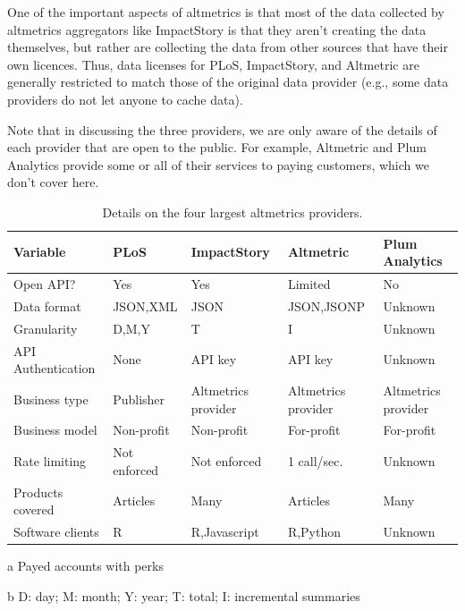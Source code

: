 \documentclass[letterpaper,superscriptaddress,showkeys,longbibliography]{revtex4-1}\usepackage{graphicx, color}
\begin{document}
One of the important aspects of altmetrics is that most of the data collected by altmetrics aggregators like ImpactStory is that they aren't creating the data themselves, but rather are collecting the data from other sources that have their own licences. Thus, data licenses for PLoS, ImpactStory, and Altmetric are generally restricted to match those of the original data provider (e.g., some data providers do not let anyone to cache data). 

Note that in discussing the three providers, we are only aware of the details of each provider that are open to the public. For example, Altmetric and Plum Analytics provide some or all of their services to paying customers, which we don't cover here. 

\begin{table}[!ht]
    \begin{threeparttable}[b]
    \caption{Details on the four largest altmetrics providers.}\label{tab:a} %
        \begin{tabular}{|l|l|l|l|l|}
            \hline
            Variable & PLoS & ImpactStory & Altmetric & Plum Analytics \\
            \hline
            Open API? & Yes & Yes & Limited\tnote{d} & No \\
            Data format & JSON,XML & JSON & JSON,JSONP & Unknown \\
            Granularity\tnote{b} & D,M,Y & T & I & Unknown \\
            API Authentication & None & API key & API key & Unknown \\
            Business type & Publisher & Altmetrics provider & Altmetrics provider & Altmetrics provider \\
            Business model & Non-profit & Non-profit & For-profit & For-profit \\
            Rate limiting & Not enforced & Not enforced\tnote{c} & 1 call/sec.\tnote{d} & Unknown \\
            Products covered & Articles & Many\tnote{e} & Articles & Many\tnote{f} \\
            Software clients & R\tnote{g} & R,Javascript\tnote{h} & R,Python\tnote{i} & Unknown \\
            \hline
        \end{tabular}
        \begin{tablenotes}
            \item[a] Payed accounts with perks
            \item[b] D: day; M: month; Y: year; T: total; I: incremental summaries

\end{tablenotes}
\end{threeparttable}
\end{table}
\end{document}
